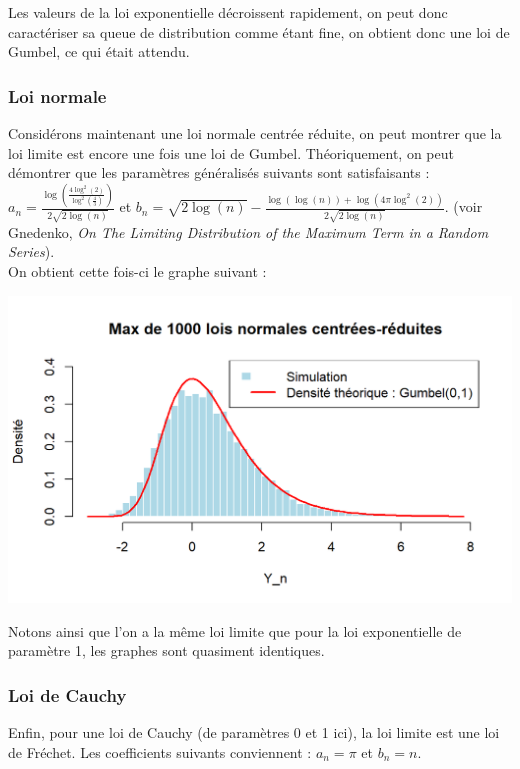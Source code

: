 \documentclass{article}
\theoremstyle{plain}
\theoremstyle{definition}
\theoremstyle{plain}
\begin{document}
\noindent Les valeurs de la loi exponentielle décroissent rapidement, on peut donc caractériser sa queue de distribution comme étant fine, on obtient donc une loi de Gumbel, ce qui était attendu.

\subsubsection{Loi normale}

\noindent Considérons maintenant une loi normale centrée réduite, on peut montrer que la loi limite est encore une fois une loi de Gumbel. Théoriquement, on peut démontrer que les paramètres généralisés suivants sont satisfaisants : $a_n = \frac{\log\left(\frac{4\log^2(2)}{\log^2\left(\frac{4}{3}\right)}\right)}{2\sqrt{2\log(n)}} $ et $b_n = \sqrt{2\log(n)} - \frac{\log(\log(n)) + \log\left(4\pi \log^2(2)\right)}{2\sqrt{2\log(n)}} $. (voir Gnedenko, \textit{On The Limiting Distribution of the Maximum Term in a Random Series}). \\

\noindent On obtient cette fois-ci le graphe suivant :

\begin{center}
	\includegraphics[scale=0.8]{./images/Max_Normale.png} 
\end{center}

\noindent Notons ainsi que l'on a la même loi limite que pour la loi exponentielle de paramètre 1, les graphes sont quasiment identiques.

\subsubsection{Loi de Cauchy}

\noindent Enfin, pour une loi de Cauchy (de paramètres 0 et 1 ici), la loi limite est une loi de Fréchet. Les coefficients suivants conviennent : $a_n = \pi $ et $b_n = n $. \\
\end{document}
